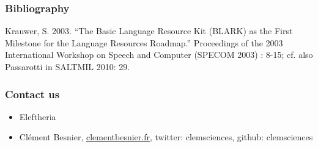 \documentclass{beamer}
\begin{document}
\begin{frame}

\frametitle{Bibliography}
Krauwer, S. 2003. “The Basic Language Resource Kit (BLARK) as the First Milestone for the Language Resources Roadmap.” Proceedings of the 2003 International Workshop on Speech and Computer (SPECOM 2003) : 8-15; cf. also Passarotti in SALTMIL 2010: 29.

\end{frame}


\begin{frame}
\frametitle{Contact us}

\begin{itemize}
\item Eleftheria

\item Clément Besnier, \href{https://www.clementbesnier.fr}{clementbesnier.fr}, twitter: clemsciences, github: clemsciences
\end{itemize}

\end{frame}












\end{document}
